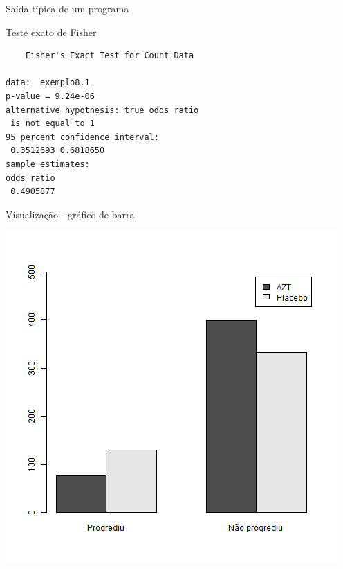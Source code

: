 \documentclass{beamer}
\begin{document}
\begin{frame}[fragile]{\scriptsize Saída típica de um programa}
  \begin{block}{Teste exato de Fisher}
    \footnotesize
\begin{verbatim}
	Fisher's Exact Test for Count Data

data:  exemplo8.1
p-value = 9.24e-06
alternative hypothesis: true odds ratio
 is not equal to 1
95 percent confidence interval:
 0.3512693 0.6818650
sample estimates:
odds ratio
 0.4905877
\end{verbatim}
  \end{block}
\end{frame}

\begin{frame}{\scriptsize Visualização - gráfico de barra}
  \begin{center}
    \includegraphics[height=\textheight]{Cap26-27/barplot}
  \end{center}
\end{frame}
\end{document}
